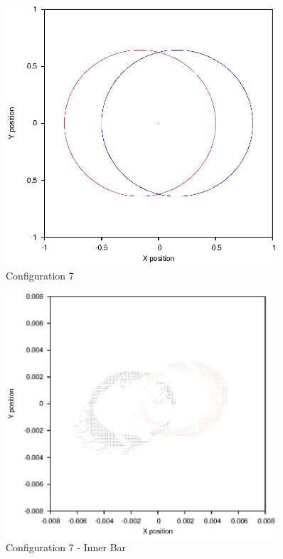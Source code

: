\documentclass[a4paper,12pt]{article}
\begin{document}
\begin{figure}[H]
\centering
\includegraphics[width=0.9\textwidth]{./2016results/005-58-005-3/Orbit.eps}
\caption{Configuration 7}
\label{fig:config7}
\end{figure}
\begin{figure}[H]
\centering
\includegraphics[width=0.9\textwidth]{./2016results/005-58-005-3/Inner.eps}
\caption{Configuration 7 - Inner Bar}
\label{fig:config7i}
\end{figure}
\end{document}
